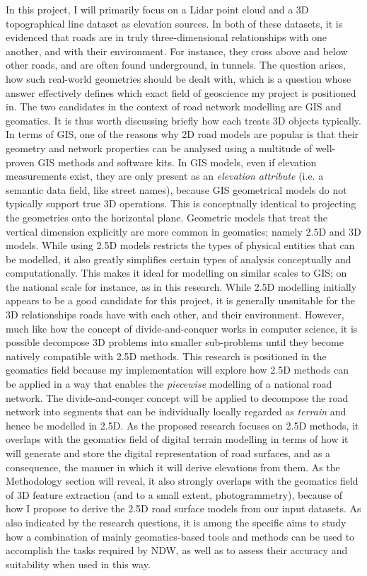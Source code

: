 In this project, I will primarily focus on a Lidar point cloud and a 3D topographical line dataset as elevation sources. In both of these datasets, it is evidenced that roads are in truly three-dimensional relationships with one another, and with their environment. For instance, they cross above and below other roads, and are often found underground, in tunnels. The question arises, how such real-world geometries should be dealt with, which is a question whose answer effectively defines which exact field of geoscience my project is positioned in. The two candidates in the context of road network modelling are GIS and geomatics. It is thus worth discussing briefly how each treats 3D objects typically. In terms of GIS, one of the reasons why 2D road models are popular is that their geometry and network properties can be analysed using a multitude of well-proven GIS methods and software kits. In GIS models, even if elevation measurements exist, they are only present as an \textit{elevation attribute} (i.e. a semantic data field, like street names), because GIS geometrical models do not typically support true 3D operations. This is conceptually identical to projecting the geometries onto the horizontal plane. Geometric models that treat the vertical dimension explicitly are more common in geomatics; namely 2.5D and 3D models. While using 2.5D models restricts the types of physical entities that can be modelled, it also greatly simplifies certain types of analysis conceptually and computationally. This makes it ideal for modelling on similar scales to GIS; on the national scale for instance, as in this research. While 2.5D modelling initially appears to be a good candidate for this project, it is generally unsuitable for the 3D relationships roads have with each other, and their environment. However, much like how the concept of divide-and-conquer works in computer science, it is possible decompose 3D problems into smaller sub-problems until they become natively compatible with 2.5D methods. This research is positioned in the geomatics field because my implementation will explore how 2.5D methods can be applied in a way that enables the \textit{piecewise} modelling of a national road network. The divide-and-conqer concept will be applied to decompose the road network into segments that can be individually locally regarded as \textit{terrain} and hence be modelled in 2.5D. As the proposed research focuses on 2.5D methods, it overlaps with the geomatics field of digital terrain modelling in terms of how it will generate and store the digital representation of road surfaces, and as a consequence, the manner in which it will derive elevations from them. As the Methodology section will reveal, it also strongly overlaps with the geomatics field of 3D feature extraction (and to a small extent, photogrammetry), because of how I propose to derive the 2.5D road surface models from our input datasets. As also indicated by the research questions, it is among the specific aims to study how a combination of mainly geomatics-based tools and methods can be used to accomplish the tasks required by NDW, as well as to assess their accuracy and suitability when used in this way.

